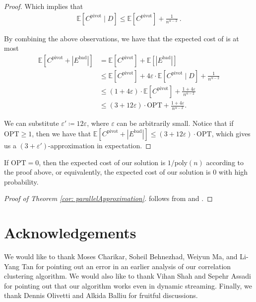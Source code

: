 \documentclass{theoretics}
\newcommand{\poly}{\mathrm{poly}}
\newcommand{\eps}{\ensuremath{\varepsilon}}
\newcommand{\ourcluster}{\ensuremath{C^{\textrm{pivot}}}\xspace}
\newcommand{\opt}{\textrm{OPT}\xspace}
\newcommand{\badedges}{\ensuremath{E^{\textrm{bad}}}\xspace}
\begin{document}
\begin{proof}
 Which implies that 
 \begin{align*}
     \mathbb{E}\left[\ourcluster\mid D \right] \leq \mathbb{E}\left[\ourcluster\right] + \frac{1}{n^{\alpha-2}}\ .
 \end{align*}

By combining the above observations, we have that the expected cost of  is at most
\begin{align*}
    \mathbb{E}\left[\ourcluster  + |\badedges|\right] &= \mathbb{E}\left[\ourcluster\right]  + \mathbb{E}\left[|\badedges|\right]\\
    &\leq \mathbb{E}\left[\ourcluster\right] + 4\eps\cdot \mathbb{E}[\ourcluster\mid D] + \frac{1}{n^{\alpha-2}}\\
    &\leq (1 + 4\eps)\cdot \mathbb{E}\left[\ourcluster\right] + \frac{1+4\eps}{n^{\alpha-2}}\\
    &\leq (3+12\eps) \cdot \opt + \frac{1+4\eps}{n^{\alpha-2}}.
\end{align*}


We can substitute $\eps' \coloneqq 12\eps$, where $\eps$ can be arbitrarily small. 
Notice that if $\opt \geq 1$, then we have that $\mathbb{E}\left[\ourcluster  + |\badedges|\right]\leq (3+12\eps) \cdot \opt$, which gives us a $(3+\eps')$-approximation in expectation. \qedhere


\end{proof}

\begin{remark}
    If $\opt = 0$, then the expected cost of our solution is $1/\poly(n)$ according to the proof above, or equivalently, the expected cost of our solution is $0$ with high probability.
\end{remark}

\begin{proof}[Proof of Theorem \ref{cor: parallelApproximation}]
     follows from  and .
\end{proof}

\section*{Acknowledgements}
We would like to thank Moses Charikar, Soheil Behnezhad, Weiyun Ma, and Li-Yang Tan for pointing out an error in an earlier analysis of our correlation clustering algorithm.
We would also like to thank Vihan Shah and Sepehr Assadi for pointing out that our algorithm works even in dynamic streaming. Finally, we thank Dennis Olivetti and Alkida Balliu for fruitful discussions.
\end{document}
